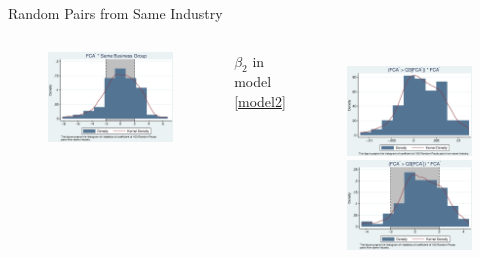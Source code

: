 \documentclass{beamer}
\begin{document}
\begin{frame}{Random Pairs from Same Industry}
\begin{columns}
\begin{figure}
				\includegraphics[width=\linewidth]{IndustryPseudoSBFCA_t.eps}
			\end{figure}
			\begin{center}
				$ \beta_2 $ in model \ref{model2}
			\end{center}
			\begin{figure}
				\centering
				\includegraphics[width=\linewidth]{IndustryPseudoMNMFCA.eps}\\
				\includegraphics[width=\linewidth]{IndustryPseudoMNMFCA_t.eps}

\end{figure}
\end{columns}
\end{frame}
\end{document}

